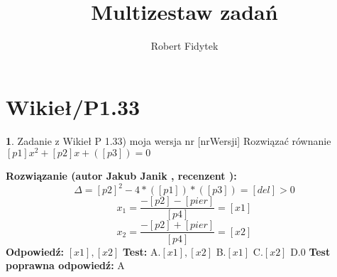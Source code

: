 \documentclass[12pt, a4paper]{article}
\title{Multizestaw zadań}
\author{Robert Fidytek}
\date{}
\theoremstyle{definition} %
\newtheorem{zad}{}
\newcommand{\kategoria}[1]{\section{#1}} %
\newcommand{\zadStart}[1]{\begin{zad}#1\newline} %
\newcommand{\zadStop}{\end{zad}}   %
\newcommand{\rozwStart}[2]{\noindent \textbf{Rozwiązanie (autor #1 , recenzent #2): }\newline} %
\newcommand{\rozwStop}{\newline}                                            %
\newcommand{\odpStart}{\noindent \textbf{Odpowiedź:}\newline}    %
\newcommand{\odpStop}{\newline}                                             %
\newcommand{\testStart}{\noindent \textbf{Test:}\newline} %
\newcommand{\testStop}{\newline} %
\newcommand{\kluczStart}{\noindent \textbf{Test poprawna odpowiedź:}\newline} %
\newcommand{\kluczStop}{\newline} %
\begin{document}
\maketitle


\kategoria{Wikieł/P1.33}
\zadStart{Zadanie z Wikieł P 1.33) moja wersja nr [nrWersji]}
Rozwiązać równanie $[p1]x^2 + [p2]x +([p3]) = 0$
\zadStop
\rozwStart{Jakub Janik}{}
$$\Delta = [p2]^2 - 4*([p1])*([p3]) = [del] > 0$$
$$x_1 = \frac{-[p2]-[pier]}{[p4]}=[x1]$$
$$x_2 = \frac{-[p2]+[pier]}{[p4]}=[x2]$$
\rozwStop
\odpStart
$[x1], [x2]$
\odpStop
\testStart
A.$[x1],[x2]$
B.$[x1]$
C.$[x2]$
D.$0$
\testStop
\kluczStart
A
\kluczStop
\end{document}

